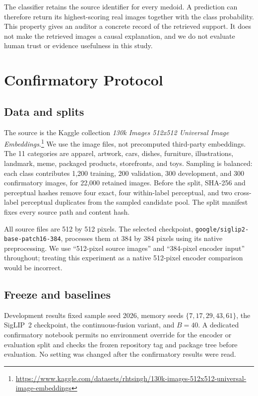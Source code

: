 \documentclass[10pt,twocolumn]{article}
\begin{document}
The classifier retains the source identifier for every medoid. A prediction can
therefore return its highest-scoring real images together with the class probability.
This property gives an auditor a concrete record of the retrieved support. It does not
make the retrieved images a causal explanation, and we do not evaluate human trust or
evidence usefulness in this study.

\section{Confirmatory Protocol}
\label{sec:protocol}

\subsection{Data and splits}

The source is the Kaggle collection \emph{130k Images 512x512 Universal Image
Embeddings}.\footnote{\url{https://www.kaggle.com/datasets/rhtsingh/130k-images-512x512-universal-image-embeddings}}
We use the image files, not precomputed third-party embeddings. The 11 categories are
apparel, artwork, cars, dishes, furniture, illustrations, landmark, meme, packaged
products, storefronts, and toys. Sampling is balanced: each class contributes 1,200
training, 200 validation, 300 development, and 300 confirmatory images, for 22,000
retained images. Before the split, SHA-256 and perceptual hashes remove four exact,
four within-label perceptual, and two cross-label perceptual duplicates from the sampled
candidate pool. The split manifest fixes every source path and content hash.

All source files are 512 by 512 pixels. The selected checkpoint,
\texttt{google/siglip2-base-patch16-384}, processes them at 384 by 384 pixels using its
native preprocessing. We use ``512-pixel source images'' and ``384-pixel encoder input''
throughout; treating this experiment as a native 512-pixel encoder comparison would be
incorrect.

\subsection{Freeze and baselines}

Development results fixed sample seed 2026, memory seeds
$\{7,17,29,43,61\}$, the SigLIP~2 checkpoint, the continuous-fusion variant, and
$B=40$. A dedicated confirmatory notebook permits no environment override for the
encoder or evaluation split and checks the frozen repository tag and package tree
before evaluation. No setting was changed after the confirmatory results were read.
\end{document}
